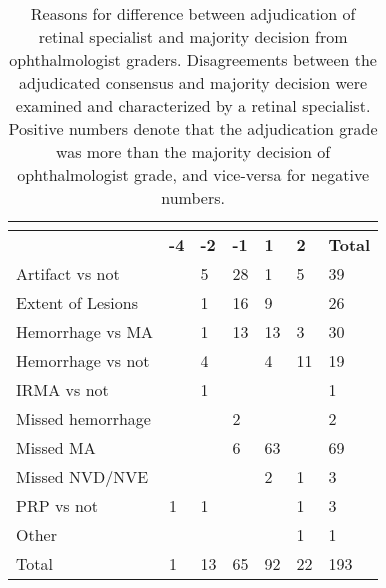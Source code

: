 \documentclass{llncs}
\begin{document}
\begin{table}[t]
  \centering
  \begin{tabular}{|l|l|l|l|l|l|l|}
    \hline
    &  \\ \hline
    & \textbf{-4} \quad\quad\quad  & \textbf{-2} \quad\quad\quad  & \textbf{-1} \quad\quad\quad  & \textbf{1} \quad\quad\quad  & \textbf{2} \quad\quad\quad   & \textbf{Total} \quad\quad\quad   \\ \hline
    Artifact vs not & &5 &28 &1 &5 &39 \\ \hline
    Extent of Lesions & &1 &16 &9 & &26 \\ \hline
    Hemorrhage vs MA & &1 &13 &13 &3 &30 \\ \hline
    Hemorrhage vs not & &4 & &4 &11 &19 \\ \hline
    IRMA vs not & &1 & & & &1 \\ \hline
    Missed hemorrhage & & &2 & & &2 \\ \hline
    Missed MA & & & 6& 63& & 69\\ \hline
    Missed NVD/NVE & & & &2 &1 &3 \\ \hline
    PRP vs not & 1& 1& & & 1& 3\\ \hline
    Other & & & & &1 &1 \\ \hline
    Total & 1& 13& 65& 92& 22& 193\\ \hline
  \end{tabular}
  \vspace{4mm}
  \caption{
Reasons for difference between adjudication of retinal specialist and majority decision from ophthalmologist graders.  Disagreements between the adjudicated consensus and majority decision were examined and characterized by a retinal specialist. Positive numbers denote that the adjudication grade was more than the majority decision of ophthalmologist grade, and vice-versa for negative numbers.
  }
  \label{table:reasons}
\end{table}
\end{document}
